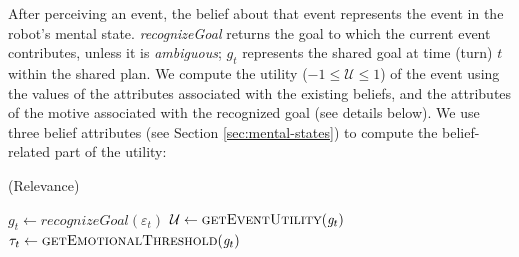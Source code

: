 After perceiving an event, the belief about that event represents the event in
the robot's mental state. \textit{recognizeGoal} returns the goal to which the
current event contributes, unless it is \textit{ambiguous}; $g_{t}$ represents
the shared goal at time (turn) $t$ within the shared plan. We compute the
utility ($-1 \leq \mathcal{U} \leq 1$) of the event using the values of the
attributes associated with the existing beliefs, and the attributes of the
motive associated with the recognized goal (see details below). We use three
belief attributes (see Section \ref{sec:mental-states}) to compute the
belief-related part of the utility:

\begin{algorithm}
	\caption{(Relevance)}
	\label{alg:relevance}
	\begin{algorithmic}[1]
			\Statex
			\State $\mathit{g}_{t} \gets \textit{recognizeGoal}{(\varepsilon_t)}$
			\Statex
			\State $\mathcal{U} \gets \Call{getEventUtility}{\mathit{g}_{t}}$ 
			\State $\tau_{t} \gets \Call{getEmotionalThreshold}{\mathit{g}_{t}}$
			\Statex
				\State {}
			\Else
				\State {}
			\EndIf
		\EndFunction
	\end{algorithmic}
\end{algorithm}

